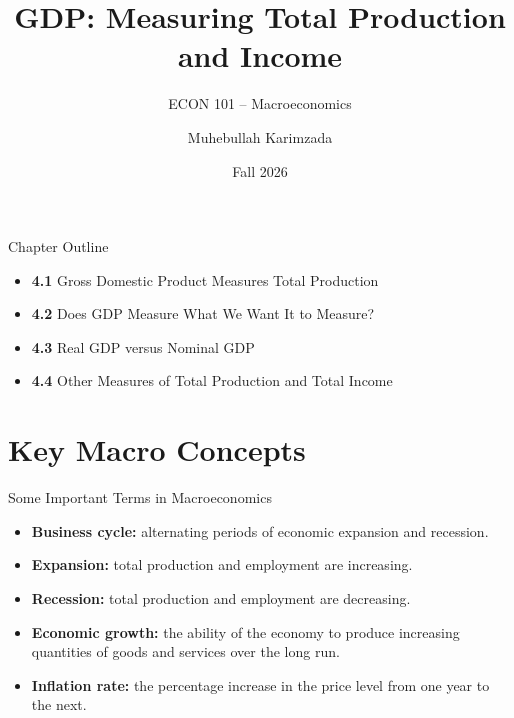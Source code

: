 \documentclass[aspectratio=169]{beamer}
\title{\textbf{GDP: Measuring Total Production and Income}}
\subtitle{{\large ECON 101 -- Macroeconomics}}
\author{Muhebullah Karimzada}
\date{Fall 2026}
\begin{document}

\begin{frame}[plain]
  \titlepage
\end{frame}

\begin{frame}{Chapter Outline}
\transfade
\begin{itemize}
  \item \textbf{4.1} Gross Domestic Product Measures Total Production
  \item \textbf{4.2} Does GDP Measure What We Want It to Measure?
  \item \textbf{4.3} Real GDP versus Nominal GDP
  \item \textbf{4.4} Other Measures of Total Production and Total Income
\end{itemize}
\end{frame}

\section*{Key Macro Concepts}

\begin{frame}{Some Important Terms in Macroeconomics}
\transfade
\begin{itemize}
  \item \textbf{Business cycle:} alternating periods of economic \alert{expansion} and \alert{recession}.
  \item \textbf{Expansion:} total production and employment are \alert{increasing}.
  \item \textbf{Recession:} total production and employment are \alert{decreasing}.
  \item \textbf{Economic growth:} the ability of the economy to produce increasing quantities of goods and services over the long run.
  \item \textbf{Inflation rate:} the \alert{percentage increase} in the price level from one year to the next.
\end{itemize}
\end{frame}
\end{document}
